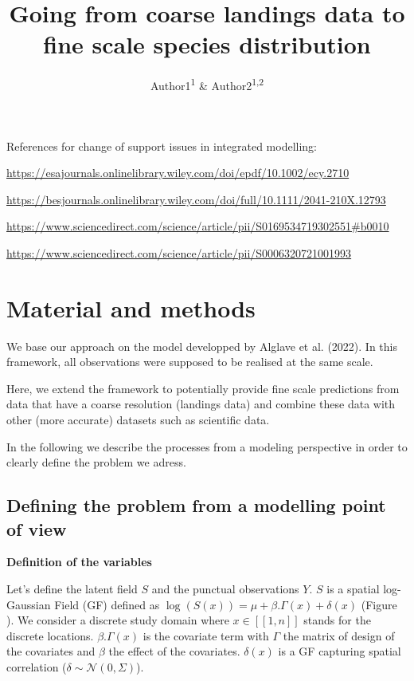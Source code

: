 \documentclass[
  english,
  man]{apa6}
\title{Going from coarse landings data to fine scale species distribution}
\author{Author1\textsuperscript{1} \& Author2\textsuperscript{1,2}}
\date{}
\affiliation{\vspace{0.5cm}\textsuperscript{1} Instit1\\\textsuperscript{2} Instit2}
\begin{document}
\maketitle

References for change of support issues in integrated modelling:

\url{https://esajournals.onlinelibrary.wiley.com/doi/epdf/10.1002/ecy.2710}

\url{https://besjournals.onlinelibrary.wiley.com/doi/full/10.1111/2041-210X.12793}

\url{https://www.sciencedirect.com/science/article/pii/S0169534719302551\#b0010}

\url{https://www.sciencedirect.com/science/article/pii/S0006320721001993}

\hypertarget{material-and-methods}{%
\section{Material and methods}\label{material-and-methods}}

We base our approach on the model developped by Alglave et al. (2022). In this framework, all observations were supposed to be realised at the same scale.

Here, we extend the framework to potentially provide fine scale predictions from data that have a coarse resolution (landings data) and combine these data with other (more accurate) datasets such as scientific data.

In the following we describe the processes from a modeling perspective in order to clearly define the problem we adress.

\hypertarget{defining-the-problem-from-a-modelling-point-of-view}{%
\subsection{Defining the problem from a modelling point of view}\label{defining-the-problem-from-a-modelling-point-of-view}}

\textbf{Definition of the variables}

Let's define the latent field \(S\) and the punctual observations \(Y\). \(S\) is a spatial log-Gaussian Field (GF) defined as \(\log(S(x))=\mu+\beta . \Gamma(x) + \delta(x)\) (Figure \label{fig:ParBiasSingle}). We consider a discrete study domain where \(x \in [\![1,n]\!]\) stands for the discrete locations. \(\beta . \Gamma(x)\) is the covariate term with \(\Gamma\) the matrix of design of the covariates and \(\beta\) the effect of the covariates. \(\delta(x)\) is a GF capturing spatial correlation (\(\delta \sim \mathcal{N}(0,\Sigma)\)).
\end{document}
